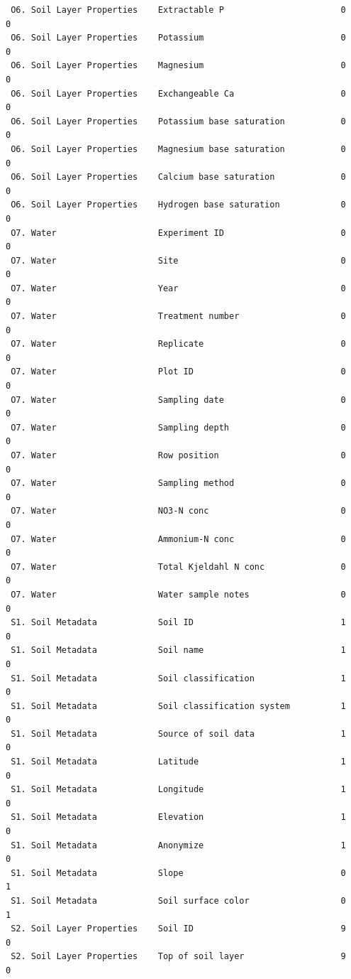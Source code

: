 \documentclass[
]{article}
\begin{document}
\begin{verbatim}
 O6. Soil Layer Properties    Extractable P                       0       0
 O6. Soil Layer Properties    Potassium                           0       0
 O6. Soil Layer Properties    Magnesium                           0       0
 O6. Soil Layer Properties    Exchangeable Ca                     0       0
 O6. Soil Layer Properties    Potassium base saturation           0       0
 O6. Soil Layer Properties    Magnesium base saturation           0       0
 O6. Soil Layer Properties    Calcium base saturation             0       0
 O6. Soil Layer Properties    Hydrogen base saturation            0       0
 O7. Water                    Experiment ID                       0       0
 O7. Water                    Site                                0       0
 O7. Water                    Year                                0       0
 O7. Water                    Treatment number                    0       0
 O7. Water                    Replicate                           0       0
 O7. Water                    Plot ID                             0       0
 O7. Water                    Sampling date                       0       0
 O7. Water                    Sampling depth                      0       0
 O7. Water                    Row position                        0       0
 O7. Water                    Sampling method                     0       0
 O7. Water                    NO3-N conc                          0       0
 O7. Water                    Ammonium-N conc                     0       0
 O7. Water                    Total Kjeldahl N conc               0       0
 O7. Water                    Water sample notes                  0       0
 S1. Soil Metadata            Soil ID                             1       0
 S1. Soil Metadata            Soil name                           1       0
 S1. Soil Metadata            Soil classification                 1       0
 S1. Soil Metadata            Soil classification system          1       0
 S1. Soil Metadata            Source of soil data                 1       0
 S1. Soil Metadata            Latitude                            1       0
 S1. Soil Metadata            Longitude                           1       0
 S1. Soil Metadata            Elevation                           1       0
 S1. Soil Metadata            Anonymize                           1       0
 S1. Soil Metadata            Slope                               0       1
 S1. Soil Metadata            Soil surface color                  0       1
 S2. Soil Layer Properties    Soil ID                             9       0
 S2. Soil Layer Properties    Top of soil layer                   9       0

\end{verbatim}
\end{document}
